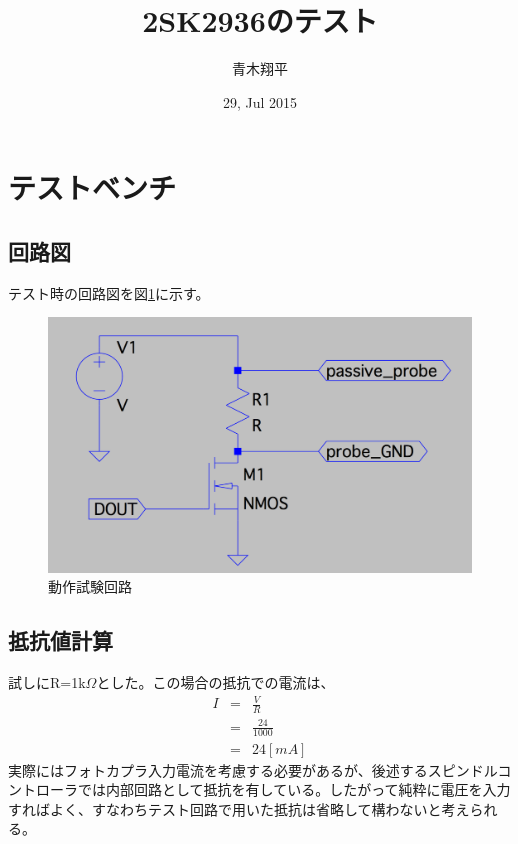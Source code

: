 \documentclass[]{jsarticle}
\begin{document}
\title{2SK2936のテスト}
\author{青木翔平}
\date{29, Jul 2015}
\maketitle

\section{テストベンチ}
\subsection{回路図}
テスト時の回路図を図\ref{testbench}に示す。




\begin{figure}[htbp]
\centering
\includegraphics[width=130mm]{./image/testbench.pdf}
\caption{動作試験回路}
\label{testbench}
\end{figure}

\subsection{抵抗値計算}
試しにR=1k$\Omega$とした。この場合の抵抗での電流は、
\begin{eqnarray*}
I & = &  \frac{V}{R} \\
   & = & \frac{24}{1000} \\
   & = & 24 [mA]
\end{eqnarray*}
実際にはフォトカプラ入力電流を考慮する必要があるが、後述するスピンドルコントローラでは内部回路として抵抗を有している。したがって純粋に電圧を入力すればよく、すなわちテスト回路で用いた抵抗は省略して構わないと考えられる。
\end{document}
